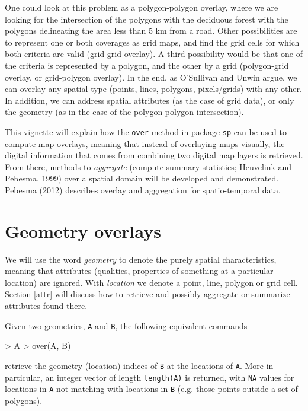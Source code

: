 \documentclass{article}
\newcommand{\code}[1]{{\tt #1}}
\begin{document}
One could look at this problem as a polygon-polygon overlay, where we
are looking for the intersection of the polygons with the deciduous
forest with the polygons delineating the area less than 5 km from
a road. Other possibilities are to represent one or both coverages
as grid maps, and find the grid cells for which both criteria are
valid (grid-grid overlay). A third possibility would be that one
of the criteria is represented by a polygon, and the other by a
grid (polygon-grid overlay, or grid-polygon overlay). In the end, as
O'Sullivan and Unwin argue, we can overlay any spatial type (points,
lines, polygons, pixels/grids) with any other. In addition, we can
address spatial attributes (as the case of grid data), or only the
geometry (as in the case of the polygon-polygon intersection).

This vignette will explain how the {\tt over} method in package
{\tt sp} can be used to compute map overlays, meaning that instead
of overlaying maps visually, the digital information that comes
from combining two digital map layers is retrieved. From there,
methods to {\em aggregate} (compute summary statistics; Heuvelink
and Pebesma, 1999) over a spatial domain will be developed and
demonstrated.  Pebesma (2012) describes overlay and aggregation
for spatio-temporal data.

\section{Geometry overlays}
We will use the word {\em geometry} to denote the purely spatial
characteristics, meaning that attributes (qualities, properties of
something at a particular location) are ignored. With {\em location}
we denote a point, line, polygon or grid cell. Section \ref{attr}
will discuss how to retrieve and possibly aggregate or summarize
attributes found there.

Given two geometries, {\tt A} and {\tt B}, the following equivalent
commands
\begin{Schunk}
\begin{Sinput}
> A %
> over(A, B)
\end{Sinput}
\end{Schunk}
retrieve the geometry (location) indices of \code{B} at the locations
of \code{A}. More in particular, an integer vector of length
{\tt length(A)} is returned, with {\tt NA} values for locations in {\tt A}
not matching with locations in {\tt B} (e.g. those points outside
a set of polygons). 
\end{document}

